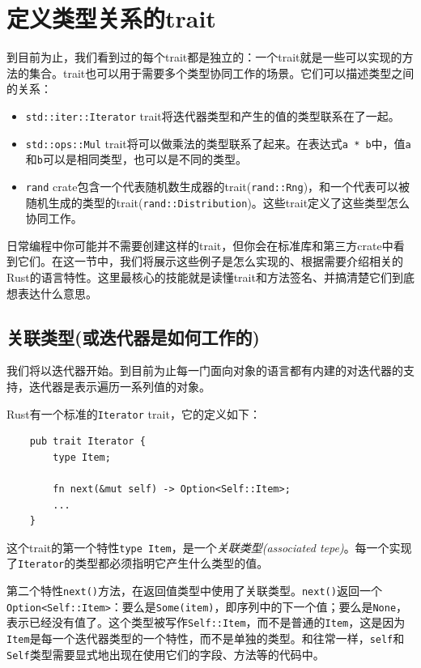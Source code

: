 \section{定义类型关系的trait}

到目前为止，我们看到过的每个trait都是独立的：一个trait就是一些可以实现的方法的集合。trait也可以用于需要多个类型协同工作的场景。它们可以描述类型之间的关系：
\begin{itemize}
    \item \texttt{std::iter::Iterator} trait将迭代器类型和产生的值的类型联系在了一起。
    \item \texttt{std::ops::Mul} trait将可以做乘法的类型联系了起来。在表达式\texttt{a * b}中，值\texttt{a}和\texttt{b}可以是相同类型，也可以是不同的类型。
    \item \texttt{rand} crate包含一个代表随机数生成器的trait(\texttt{rand::Rng})，和一个代表可以被随机生成的类型的trait(\texttt{rand::Distribution})。这些trait定义了这些类型怎么协同工作。
\end{itemize}

日常编程中你可能并不需要创建这样的trait，但你会在标准库和第三方crate中看到它们。在这一节中，我们将展示这些例子是怎么实现的、根据需要介绍相关的Rust的语言特性。这里最核心的技能就是读懂trait和方法签名、并搞清楚它们到底想表达什么意思。

\subsection{关联类型(或迭代器是如何工作的)}
我们将以迭代器开始。到目前为止每一门面向对象的语言都有内建的对迭代器的支持，迭代器是表示遍历一系列值的对象。

Rust有一个标准的\texttt{Iterator} trait，它的定义如下：
\begin{verbatim}
    pub trait Iterator {
        type Item;

        fn next(&mut self) -> Option<Self::Item>;
        ...
    }
\end{verbatim}

这个trait的第一个特性\texttt{type Item}，是一个\emph{关联类型(associated tepe)}。每一个实现了\texttt{Iterator}的类型都必须指明它产生什么类型的值。

第二个特性\texttt{next()}方法，在返回值类型中使用了关联类型。\texttt{next()}返回一个\\
\texttt{Option<Self::Item>}：要么是\texttt{Some(item)}，即序列中的下一个值；要么是\texttt{None}，表示已经没有值了。这个类型被写作\texttt{Self::Item}，而不是普通的\texttt{Item}，这是因为\texttt{Item}是每一个迭代器类型的一个特性，而不是单独的类型。和往常一样，\texttt{self}和\texttt{Self}类型需要显式地出现在使用它们的字段、方法等的代码中。

